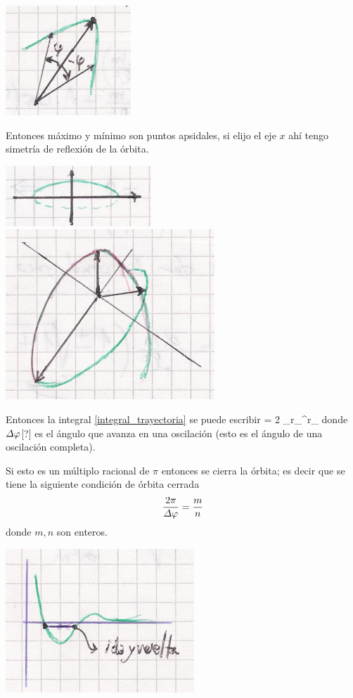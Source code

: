 \documentclass[10pt,oneside]{CBFT_book}
\begin{document}
\includegraphics[scale=0.3]{images/fig_mc_orbitas_simetria_2.jpg}

Entonces máximo y mínimo son puntos apsidales, si elijo el eje $x$ ahí tengo simetría de reflexión de la órbita.

\includegraphics[scale=0.3]{images/fig_mc_orbitas_simetria_3.jpg}
\includegraphics[scale=0.3]{images/fig_mc_orbitas_simetria_4.jpg}

Entonces la integral \eqref{integral_trayectoria} se puede escribir 
\be
	\Delta \vp = 2 \int_{r_{}}^{r_{}}  
	\label{integral_trayectoria_vp}
\ee
donde $\Delta\varphi$[?] es el ángulo que avanza en una oscilación (esto es el ángulo de una oscilación completa).

Si esto es un múltiplo racional de $\pi$ entonces se cierra la órbita; es decir que se tiene la siguiente 
condición de órbita cerrada
\[
	\frac{2\pi}{\Delta \varphi} = \frac{m}{n}
\]
donde $m,n$ son enteros.

\includegraphics[scale=0.3]{images/fig_mc_orbitas_simetria_5.jpg}
\end{document}
